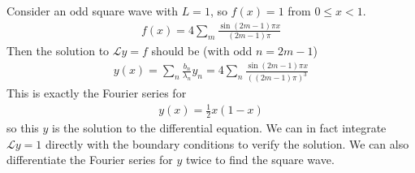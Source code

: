     \begin{example}
        Consider an odd square wave with $L = 1$, so $f(x) = 1$ from $0 \leq x < 1$.
        \begin{align*}
            f(x) = 4 \sum_m \frac{\sin(2m-1)\pi x}{(2m-1)\pi}
        \end{align*}
        Then the solution to $\mathcal L y = f$ should be (with odd $n = 2m-1$)
        \begin{align*}
            y(x) = \sum_n \frac{b_n}{\lambda_n} y_n = 4 \sum_n \frac{\sin (2m-1) \pi x}{((2m - 1) \pi)^3}
        \end{align*}
        This is exactly the Fourier series for
        \begin{align*}
            y(x) = \frac{1}{2}x(1-x)
        \end{align*}
        so this $y$ is the solution to the differential equation.
        We can in fact integrate $\mathcal L y = 1$ directly with the boundary conditions to verify the solution.
        We can also differentiate the Fourier series for $y$ twice to find the square wave.
    \end{example}
